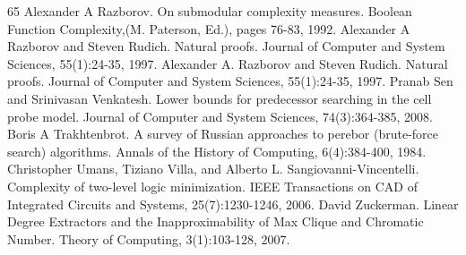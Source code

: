 \documentclass[10pt,a4paper]{article}
\begin{document}
\begin{thebibliography}{65}
 Alexander A Razborov. On submodular complexity measures. Boolean Function Complexity,(M. Paterson, Ed.), pages 76-83, 1992.
 Alexander A Razborov and Steven Rudich. Natural proofs. Journal of Computer and System Sciences, 55(1):24-35, 1997.
 Alexander A. Razborov and Steven Rudich. Natural proofs. Journal of Computer and System Sciences, 55(1):24-35, 1997.
 Pranab Sen and Srinivasan Venkatesh. Lower bounds for predecessor searching in the cell probe model. Journal of Computer and System Sciences, 74(3):364-385, 2008.
 Boris A Trakhtenbrot. A survey of Russian approaches to perebor (brute-force search) algorithms. Annals of the History of Computing, 6(4):384-400, 1984.
 Christopher Umans, Tiziano Villa, and Alberto L. Sangiovanni-Vincentelli. Complexity of two-level logic minimization. IEEE Transactions on CAD of Integrated Circuits and Systems, 25(7):1230-1246, 2006.
 David Zuckerman. Linear Degree Extractors and the Inapproximability of Max Clique and Chromatic Number. Theory of Computing, 3(1):103-128, 2007.
\end{thebibliography}
\end{document}
